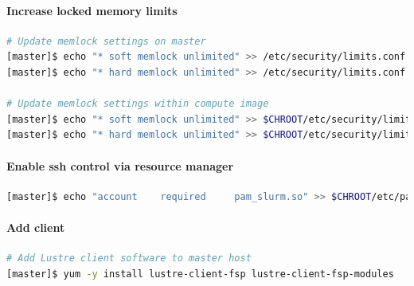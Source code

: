 \documentclass[letterpaper]{article}
\newcommand{\baseOS}{CentOS7.1*}
\begin{document}
\paragraph{Increase locked memory limits}

 

\begin{lstlisting}[language=bash,keywords={},upquote=true]
# Update memlock settings on master
[master]$ echo "* soft memlock unlimited" >> /etc/security/limits.conf
[master]$ echo "* hard memlock unlimited" >> /etc/security/limits.conf

# Update memlock settings within compute image
[master]$ echo "* soft memlock unlimited" >> $CHROOT/etc/security/limits.conf
[master]$ echo "* hard memlock unlimited" >> $CHROOT/etc/security/limits.conf
\end{lstlisting}


\paragraph{Enable ssh control via resource manager} 



\begin{lstlisting}[language=bash,keywords={},upquote=true]
[master]$ echo "account    required     pam_slurm.so" >> $CHROOT/etc/pam.d/sshd
\end{lstlisting}

\paragraph{Add \Lustre{} client} \label{sec:lustre_client}



\begin{lstlisting}[language=bash,keywords={},upquote=true]
# Add Lustre client software to master host
[master]$ yum -y install lustre-client-fsp lustre-client-fsp-modules
\end{lstlisting}
\end{document}

